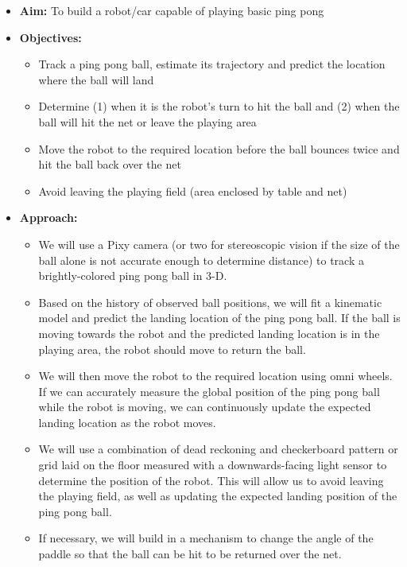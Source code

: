 \documentclass[letterpaper, 11pt]{article}
\begin{document}
\begin{itemize}
    \item \textbf{Aim:} To build a robot/car capable of playing basic ping pong
    \item \textbf{Objectives:}
        \begin{itemize}
            \item Track a ping pong ball, estimate its trajectory and predict the location where the ball will land
            \item Determine (1) when it is the robot's turn to hit the ball and (2) when the ball will hit the net or leave the playing area
            \item Move the robot to the required location before the ball bounces twice and hit the ball back over the net
            \item Avoid leaving the playing field (area enclosed by table and net)
        \end{itemize}
    \item \textbf{Approach:}
        \begin{itemize}
            \item We will use a Pixy camera (or two for stereoscopic vision if the size of the ball alone is not accurate enough to determine distance) to track a brightly-colored ping pong ball in 3-D.
            \item Based on the history of observed ball positions, we will fit a kinematic model and predict the landing location of the ping pong ball. If the ball is moving towards the robot and the predicted landing location is in the playing area, the robot should move to return the ball.
            \item We will then move the robot to the required location using omni wheels. If we can accurately measure the global position of the ping pong ball while the robot is moving, we can continuously update the expected landing location as the robot moves.
            \item We will use a combination of dead reckoning and checkerboard pattern or grid laid on the floor measured with a downwards-facing light sensor to determine the position of the robot. This will allow us to avoid leaving the playing field, as well as updating the expected landing position of the ping pong ball.
            \item If necessary, we will build in a mechanism to change the angle of the paddle so that the ball can be hit to be returned over the net.
        \end{itemize}
\end{itemize}
\end{document}
